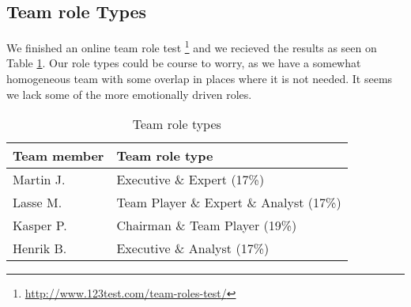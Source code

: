 \subsection{Team role Types}
We finished an online team role test \footnote{\url{http://www.123test.com/team-roles-test/}} and we recieved the results as seen on 
Table \ref{tab:roleTypes}. Our role types could be course to worry, as we have a somewhat homogeneous team with some overlap in places where
it is not needed. It seems we lack some of the more emotionally driven roles.
\begin{table}[!ht]
    \centering
    \begin{tabular}{l|l}
        \rowcolor{Gray}
        \textbf{Team member} & \textbf{Team role type}\\\hline
        Martin J.            & Executive \& Expert (17\%) \\
        Lasse M.             & Team Player \& Expert \& Analyst (17\%) \\
        Kasper P.            & Chairman \& Team Player (19\%) \\
        Henrik B.            & Executive \& Analyst (17\%)
    \end{tabular}
    \caption{Team role types}
    \label{tab:roleTypes}
\end{table}

